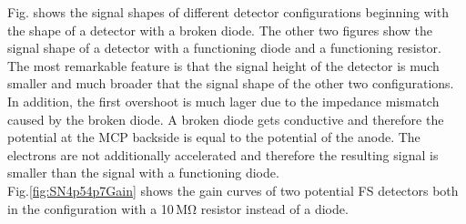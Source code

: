 	Fig.  shows the signal shapes of different detector configurations beginning with the shape of a detector with a broken diode. The other two figures show the signal shape of a detector with a functioning diode and a functioning resistor. The most remarkable feature is that the signal height of the detector is much smaller and much broader that the signal shape of the other two configurations. In addition, the first overshoot is much lager due to the impedance mismatch caused by the broken diode. A broken diode gets conductive and therefore the potential at the MCP backside is equal to the potential of the anode. The electrons are not additionally accelerated and therefore the resulting signal is smaller than the signal with a functioning diode.\\
	Fig.\ref{fig:SN4p54p7Gain} shows the gain curves of two potential FS detectors both in the configuration with a 10\,\si{\mega\ohm} resistor instead of a diode. 
